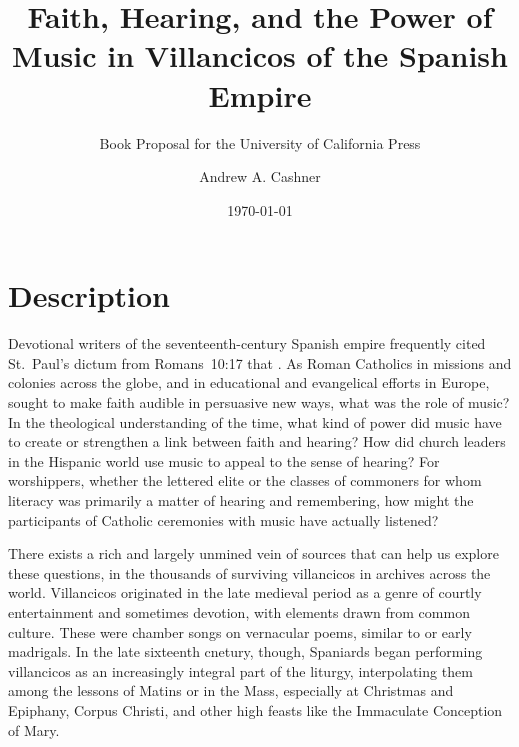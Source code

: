 \documentclass[tt]{vcbook-proposal}
\newcommand{\publisher}{the University of California Press}
\begin{document}
\frontmatter

\begin{titlingpage}
\title    {Faith, Hearing, and the Power of Music 
           in Villancicos of the Spanish Empire}
\subtitle {Book Proposal for \publisher}
\author   {Andrew A. Cashner}
\date     {\today}
\maketitle
\end{titlingpage}

\tableofcontents*

\mainmatter

\section{Description}

Devotional writers of the seventeenth-century Spanish empire frequently cited St.~Paul's dictum from Romans~10:17 that .
As Roman Catholics in missions and colonies across the globe, and in educational and evangelical efforts in Europe, sought to make faith audible in persuasive new ways, what was the role of music?
In the theological understanding of the time, what kind of power did music have to create or strengthen a link between faith and hearing?
How did church leaders in the Hispanic world use music to appeal to the sense of hearing?
For worshippers, whether the lettered elite or the classes of commoners for whom literacy was primarily a matter of hearing and remembering, how might the participants of Catholic ceremonies with music have actually listened?

There exists a rich and largely unmined vein of sources that can help us explore these questions, in the thousands of surviving villancicos in archives across the world.
Villancicos originated in the late medieval period as a genre of courtly entertainment and sometimes devotion, with elements drawn from common culture.
These were chamber songs on vernacular poems, similar to  or early madrigals.
In the late sixteenth cnetury, though, Spaniards began performing villancicos as an increasingly integral part of the liturgy, interpolating them among the lessons of Matins or in the Mass, especially at Christmas and Epiphany, Corpus Christi, and other high feasts like the Immaculate Conception of Mary.
\end{document}
